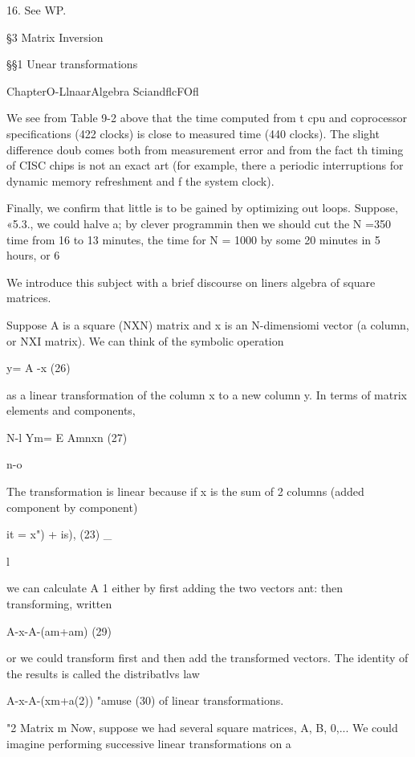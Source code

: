 {{{{{{{{16. See WP.



\S3 Matrix Inversion

\S\S1 Unear transformations

  
 
    
   
   
  

ChapterO-LlnaarAlgebra SciandflcFOfl

We see from Table 9-2 above that the time computed from t
cpu and coprocessor specifications (422 clocks) is close to
measured time (440 clocks). The slight difference doub
comes both from measurement error and from the fact th
timing of CISC chips is not an exact art (for example, there a
periodic interruptions for dynamic memory refreshment and f
the system clock).

Finally, we confirm that little is to be gained by optimizing out
loops. Suppose, «5.3., we could halve a; by clever programmin
then we should cut the N =350 time from 16 to 13 minutes,
the time for N = 1000 by some 20 minutes in 5 hours, or 6%

We introduce this subject with a brief discourse on liners
algebra of square matrices.

Suppose A is a square (NXN) matrix and x is an N-dimensiomi
vector (a column, or NXI matrix). We can think of the symbolic
operation

y= A -x (26)

 

as a linear transformation of the column x to a new column y. In
terms of matrix elements and components,

N-l
Ym= E Amnxn (27)

n-o

The transformation is linear because if x is the sum of 2 columns
(added component by component)

it = x") + is), (23) \_

l

we can calculate A 1 either by first adding the two vectors ant:
then transforming, written

A-x-A-(am+am) (29)

or we could transform first and then add the transformed vectors.
The identity of the results is called the distribatlvs law

A-x-A-(xm+a(2)) "amuse (30)
of linear transformations.

"2 Matrix m
Now, suppose we had several square matrices, A, B, 0,... We
could imagine performing successive linear transformations on a

}}}}}}}}
